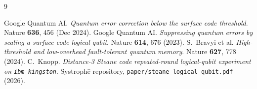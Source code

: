 \documentclass[11pt,letterpaper]{article}
\providecommand{\Systrophe}{Systroph\=e}
\begin{document}
\begin{thebibliography}{9}

 Google Quantum AI. \emph{Quantum error correction below the surface code threshold}. Nature \textbf{636}, 456 (Dec 2024).
 Google Quantum AI. \emph{Suppressing quantum errors by scaling a surface code logical qubit}. Nature \textbf{614}, 676 (2023).
 S.~Bravyi et al. \emph{High-threshold and low-overhead fault-tolerant quantum memory}. Nature \textbf{627}, 778 (2024).
 C.~Knopp. \emph{Distance-3 Steane code repeated-round logical-qubit experiment on \texttt{ibm\_kingston}}. \Systrophe{} repository, \texttt{paper/steane\_logical\_qubit.pdf} (2026).

\end{thebibliography}
\end{document}
